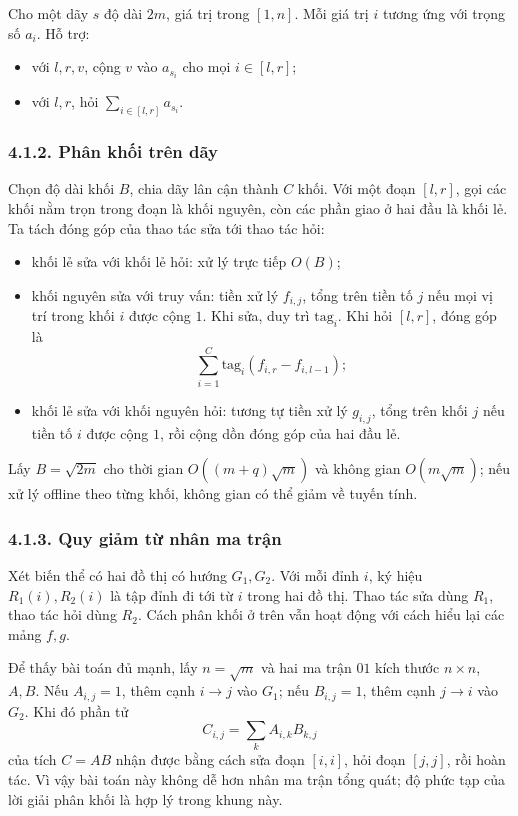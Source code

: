 \documentclass[11pt]{article}
\begin{document}
Cho một dãy \(s\) độ dài \(2m\), giá trị trong \([1,n]\). Mỗi giá trị \(i\)
tương ứng với trọng số \(a_i\). Hỗ trợ:
\begin{itemize}
  \item với \(l,r,v\), cộng \(v\) vào \(a_{s_i}\) cho mọi \(i\in[l,r]\);
  \item với \(l,r\), hỏi \(\sum_{i\in[l,r]}a_{s_i}\).
\end{itemize}

\subsubsection*{4.1.2. Phân khối trên dãy}

Chọn độ dài khối \(B\), chia dãy lân cận thành \(C\) khối. Với một đoạn
\([l,r]\), gọi các khối nằm trọn trong đoạn là khối nguyên, còn các phần giao
ở hai đầu là khối lẻ. Ta tách đóng góp của thao tác sửa tới thao tác hỏi:
\begin{itemize}
  \item khối lẻ sửa với khối lẻ hỏi: xử lý trực tiếp \(O(B)\);
  \item khối nguyên sửa với truy vấn: tiền xử lý \(f_{i,j}\), tổng trên tiền tố
  \(j\) nếu mọi vị trí trong khối \(i\) được cộng \(1\). Khi sửa, duy trì
  \(\mathrm{tag}_i\). Khi hỏi \([l,r]\), đóng góp là
  \[
    \sum_{i=1}^C \mathrm{tag}_i(f_{i,r}-f_{i,l-1});
  \]
  \item khối lẻ sửa với khối nguyên hỏi: tương tự tiền xử lý \(g_{i,j}\), tổng
  trên khối \(j\) nếu tiền tố \(i\) được cộng \(1\), rồi cộng dồn đóng góp của
  hai đầu lẻ.
\end{itemize}
Lấy \(B=\sqrt{2m}\) cho thời gian \(O((m+q)\sqrt m)\) và không gian
\(O(m\sqrt m)\); nếu xử lý offline theo từng khối, không gian có thể giảm về
tuyến tính.

\subsubsection*{4.1.3. Quy giảm từ nhân ma trận}

Xét biến thể có hai đồ thị có hướng \(G_1,G_2\). Với mỗi đỉnh \(i\), ký hiệu
\(R_1(i),R_2(i)\) là tập đỉnh đi tới từ \(i\) trong hai đồ thị. Thao tác sửa
dùng \(R_1\), thao tác hỏi dùng \(R_2\). Cách phân khối ở trên vẫn hoạt động
với cách hiểu lại các mảng \(f,g\).

Để thấy bài toán đủ mạnh, lấy \(n=\sqrt m\) và hai ma trận \(01\) kích thước
\(n\times n\), \(A,B\). Nếu \(A_{i,j}=1\), thêm cạnh \(i\to j\) vào \(G_1\);
nếu \(B_{i,j}=1\), thêm cạnh \(j\to i\) vào \(G_2\). Khi đó phần tử
\[
  C_{i,j}=\sum_k A_{i,k}B_{k,j}
\]
của tích \(C=AB\) nhận được bằng cách sửa đoạn \([i,i]\), hỏi đoạn \([j,j]\),
rồi hoàn tác. Vì vậy bài toán này không dễ hơn nhân ma trận tổng quát; độ phức
tạp của lời giải phân khối là hợp lý trong khung này.
\end{document}
